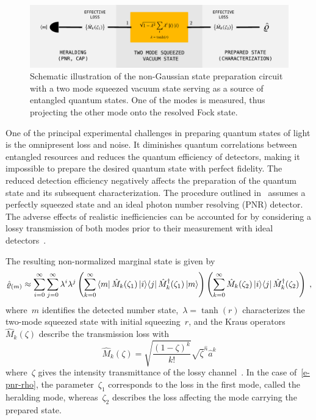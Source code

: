 \documentclass{article}
\begin{document}
\begin{figure}[h]
  \begin{center}
    \includegraphics[width = 1.00 \columnwidth]{import/illustrate_scheme_alt.pdf}
  \end{center}
  \caption{
    Schematic illustration of the non-Gaussian state preparation circuit with a two mode squeezed vacuum state serving as a source of entangled quantum states. One of the modes is measured, thus projecting the other mode onto the resolved Fock state. 
  }
  \label{f-scheme}
\end{figure}

One of the principal experimental challenges in preparing quantum states of light is the omnipresent loss and noise. It diminishes quantum correlations between entangled resources and reduces the quantum efficiency of detectors, making it impossible to prepare the desired quantum state with perfect fidelity. The reduced detection efficiency negatively affects the preparation of the quantum state and its subsequent characterization. The procedure outlined in~ assumes a perfectly squeezed state and an ideal photon number resolving (PNR) detector. The adverse effects of realistic inefficiencies can be accounted for by considering a lossy transmission of both modes prior to their measurement with ideal detectors~\cite{feito2009}.

The resulting non-normalized marginal state is given by
%
\begin{equation}\label{e-pnr-rho}
  \hatrho_{(m)} \approx
  \sum_{i = 0}^{\infty} 
  \sum_{j = 0}^{\infty}
    \lambda^{i} \lambda^{j}
    \left(
      \sum_{k = 0}^{\infty}
        \bra{m} \hat{M}_{k} (\zeta_{1}) \ketbra{i}{j} \hat{M}_{k}^{\dagger} (\zeta_{1}) \ket{m}
    \right)
    \left(
      \sum_{k = 0}^{\infty}
        \hat{M}_{k}(\zeta_{2}) \ketbra{i}{j} \hat{M}_{k}^{\dagger} (\zeta_{2})
    \right) \Qc
\end{equation}
%
where~$m$ identifies the detected number state,~${\lambda = \tanh(r)}$ characterizes the two-mode squeezed state with initial squeezing~$r$, and the Kraus operators~${\hat{M}_{k} (\zeta)}$ describe the transmission loss with
%
\begin{equation}
  \hat{M}_{k} (\zeta) =
    \sqrt{ \frac{(1 - \zeta)^{k}}{k!} } 
    \sqrt{\zeta}^{\hat{n}} \hat{a}^{k}
\end{equation}
%
where~$\zeta$ gives the intensity transmittance of the lossy channel~\cite{ivan2011}. In the case of~\eqref{e-pnr-rho}, the parameter~$\zeta_{1}$ corresponds to the loss in the first mode, called the heralding mode, whereas~$\zeta_{2}$ describes the loss affecting the mode carrying the prepared state.
\end{document}
